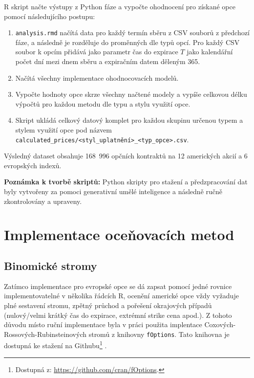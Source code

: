 \documentclass[male,czech,api_bc]{kitheses}
\begin{document}
R skript načte výstupy z Python fáze a vypočte ohodnocení pro získané opce pomocí následujícího postupu:

\begin{enumerate}
  \item \texttt{analysis.rmd} načítá data pro každý termín sběru z CSV souborů z předchozí fáze, a následně je rozděluje do proměnných dle typů opcí. Pro každý CSV soubor k opcím přidává jako parametr čas do expirace \(T\) jako kalendářní počet dní mezi dnem sběru a expiračním datem děleným 365.
  \item Načítá všechny implementace ohodnocovacích modelů.
  \item Vypočte hodnoty opce skrze všechny načtené modely a vypíše celkovou délku výpočtů pro každou metodu dle typu a stylu využití opce.
  \item Skript ukládá celkový datový komplet pro každou skupinu určenou typem a stylem využití opce pod názvem \texttt{calculated\_prices/<styl\_uplatnění>\_<typ\_opce>.csv}.
\end{enumerate}

Výsledný dataset obsahuje 168~996 opčních kontraktů na 12 amerických akcií a 6 evropských indexů. 

\bigskip
\noindent\textbf{Poznámka k tvorbě skriptů:} Python skripty pro stažení a předzpracování dat byly vytvořeny za pomoci generativní umělé inteligence a následně ručně zkontrolovány a upraveny. 

  \section{Implementace oceňovacích metod}

  \subsection{Binomické stromy}

  Zatímco implementace pro evropské opce se dá zapsat pomocí jedné rovnice implementovatelné v několika řádcích R, ocenění americké opce vždy vyžaduje plné sestavení stromu, zpětný průchod a pořešení okrajových případů (nulový/velmi krátký čas do expirace, extrémní strike cena apod.). Z tohoto důvodu místo ruční implementace byla v práci použita implentace Coxových-Rossových-Rubinsteinových stromů z knihovny \texttt{fOptions}. Tato knihovna je dostupná ke stažení na Githubu\footnote{Dostupná z: \url{https://github.com/cran/fOptions}.} \parencites{fOptions}. 
\end{document}
